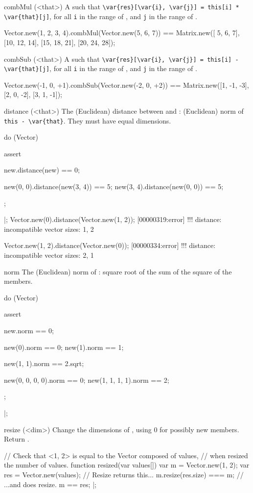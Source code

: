 \begin{urbiscriptapi}
\item[combMul](<that>)%
  A   such that
  \lstinline|\var{res}[\var{i}, \var{j}] = this[i] * \var{that}[j]|, for all
  \lstinline|i| in the range of \this, and \lstinline|j| in the range of
  \that.
\begin{urbiassert}
Vector.new(1, 2, 3, 4).combMul(Vector.new(5, 6, 7))
  == Matrix.new([ 5,  6,  7],
                [10, 12, 14],
                [15, 18, 21],
                [20, 24, 28]);
\end{urbiassert}


\item[combSub](<that>)%
  A   such that
  \lstinline|\var{res}[\var{i}, \var{j}] = this[i] - \var{that}[j]|, for all
  \lstinline|i| in the range of \this, and \lstinline|j| in the range of
  \that.
\begin{urbiassert}
Vector.new(-1, 0, +1).combSub(Vector.new(-2, 0, +2))
  == Matrix.new([1, -1, -3],
                [2,  0, -2],
                [3,  1, -1]);
\end{urbiassert}


\item[distance](<that>)%
  The (Euclidean) distance between \this and \that: (Euclidean) norm of
  \lstinline|this - \var{that}|.  They must have equal dimensions.
\begin{urbiscript}
do (Vector)
{
  assert
  {
    new.distance(new) == 0;

    new(0, 0).distance(new(3, 4)) == 5;
    new(3, 4).distance(new(0, 0)) == 5;
  };
}|;
Vector.new(0).distance(Vector.new(1, 2));
[00000319:error] !!! distance: incompatible vector sizes: 1, 2

Vector.new(1, 2).distance(Vector.new(0));
[00000334:error] !!! distance: incompatible vector sizes: 2, 1
\end{urbiscript}


\item[norm]%
  The (Euclidean) norm of \this: square root of the sum of the square of the
  members.
\begin{urbiscript}
do (Vector)
{
  assert
  {
    new.norm == 0;

    new(0).norm == 0;
    new(1).norm == 1;

    new(1, 1).norm == 2.sqrt;

    new(0, 0, 0, 0).norm == 0;
    new(1, 1, 1, 1).norm == 2;
  };
}|;
\end{urbiscript}


\item[resize](<dim>)%
  Change the dimensions of \this, using 0 for possibly new members.  Return
  \this.
\begin{urbiscript}
// Check that <1, 2> is equal to the Vector composed of values,
// when resized the number of values.
function resized(var values[])
{
  var m = Vector.new(1, 2);
  var res = Vector.new(values);
  // Resize returns this...
  m.resize(res.size) === m;
  // ...and does resize.
  m == res;
}|;


\end{urbiscript}
\end{urbiscriptapi}
